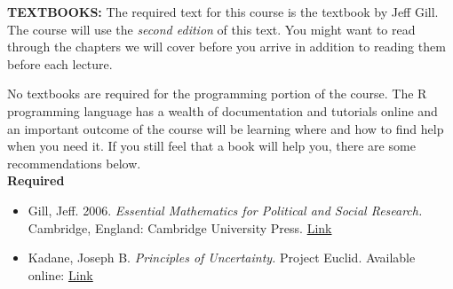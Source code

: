 \documentclass[12pt,a4paper]{article}
\begin{document}
\textbf{TEXTBOOKS:} The required text for this course is the textbook by Jeff Gill. The course will use the \textit{second edition} of this text. You might want to read through the chapters we will cover before you arrive in addition to reading them before each lecture.

No textbooks are required for the programming portion of the course.  The R programming language has a wealth of documentation and tutorials online and an important outcome of the course will be learning where and how to find help when you need it.  If you still feel that a book will help you, there are some recommendations below.\\

\textbf{Required}
\begin{itemize}
\item Gill, Jeff. 2006. \textit{Essential Mathematics for Political and Social Research.} Cambridge, England: Cambridge University Press. \href{http://www.amazon.com/Essential-Mathematics-Political-Research-Analytical/dp/052168403X/ref=sr_1_1?ie=UTF8&qid=1304604787&sr=8-1}{Link}
\item Kadane, Joseph B.  \textit{Principles of Uncertainty.} Project Euclid. Available online: \href{http://uncertainty.stat.cmu.edu/}{Link}
\end{itemize}



\end{document}
